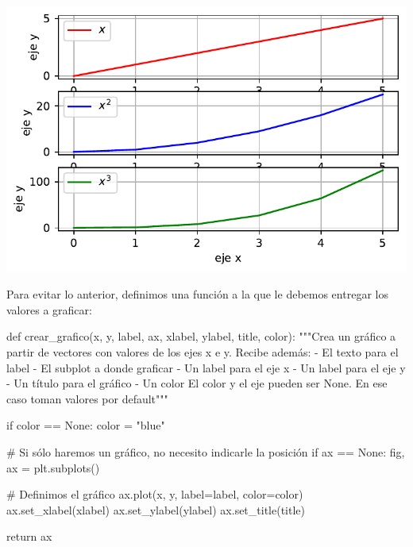 \documentclass[
  letterpaper,
  DIV=11,
  numbers=noendperiod]{scrreprt}
\newenvironment{Shaded}{\begin{snugshade}}{\end{snugshade}}
\newcommand{\CommentTok}[1]{\textcolor[rgb]{0.37,0.37,0.37}{#1}}
\newcommand{\ControlFlowTok}[1]{\textcolor[rgb]{0.00,0.23,0.31}{#1}}
\newcommand{\KeywordTok}[1]{\textcolor[rgb]{0.00,0.23,0.31}{#1}}
\newcommand{\NormalTok}[1]{\textcolor[rgb]{0.00,0.23,0.31}{#1}}
\newcommand{\OperatorTok}[1]{\textcolor[rgb]{0.37,0.37,0.37}{#1}}
\newcommand{\StringTok}[1]{\textcolor[rgb]{0.13,0.47,0.30}{#1}}
\newcommand{\VariableTok}[1]{\textcolor[rgb]{0.07,0.07,0.07}{#1}}
\begin{document}
\includegraphics{unidad_6_files/figure-pdf/cell-126-output-1.pdf}

Para evitar lo anterior, definimos una función a la que le debemos
entregar los valores a graficar:

\begin{Shaded}
\begin{Highlighting}[]
\KeywordTok{def}\NormalTok{ crear\_grafico(x, y, label, ax, xlabel, ylabel, title, color):}
  \CommentTok{"""Crea un gráfico a partir de vectores con valores de los ejes x e y.}
\CommentTok{    Recibe además:}
\CommentTok{    {-} El texto para el label}
\CommentTok{    {-} El subplot a donde graficar}
\CommentTok{    {-} Un label para el eje x}
\CommentTok{    {-} Un label para el eje y}
\CommentTok{    {-} Un título para el gráfico}
\CommentTok{    {-} Un color}
\CommentTok{    El color y el eje pueden ser None. En ese caso toman valores por default"""}

  \ControlFlowTok{if}\NormalTok{ color }\OperatorTok{==} \VariableTok{None}\NormalTok{:}
\NormalTok{    color }\OperatorTok{=} \StringTok{"blue"}

  \CommentTok{\# Si sólo haremos un gráfico, no necesito indicarle la posición}
  \ControlFlowTok{if}\NormalTok{ ax }\OperatorTok{==} \VariableTok{None}\NormalTok{:}
\NormalTok{      fig, ax }\OperatorTok{=}\NormalTok{ plt.subplots()}

  \CommentTok{\# Definimos el gráfico}
\NormalTok{  ax.plot(x, y, label}\OperatorTok{=}\NormalTok{label, color}\OperatorTok{=}\NormalTok{color)}
\NormalTok{  ax.set\_xlabel(xlabel)}
\NormalTok{  ax.set\_ylabel(ylabel)}
\NormalTok{  ax.set\_title(title)}

  \ControlFlowTok{return}\NormalTok{ ax}
\end{Highlighting}
\end{Shaded}
\end{document}
